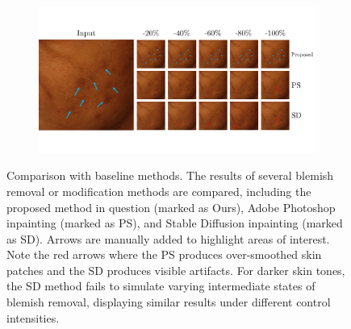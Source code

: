 \begin{spacing}{1.5}
\begin{figure}[t!]
\begin{subfigure}{\textwidth}
    \end{subfigure}
    \hfill
    \begin{subfigure}{\textwidth}
        \centering
        \includegraphics[width=\linewidth]{Chapter5/baseline/baseline44.pdf}
    \end{subfigure}
    \caption{Comparison with baseline methods. The results of several blemish removal or modification methods are compared, including the proposed method in question (marked as Ours), Adobe Photoshop\cite{adobephotoshop} inpainting (marked as PS), and Stable Diffusion\cite{rombach2021highresolution} inpainting (marked as SD). Arrows are manually added to highlight areas of interest. Note the red arrows where the PS produces over-smoothed skin patches and the SD produces visible artifacts. For darker skin tones, the SD method fails to simulate varying intermediate states of blemish removal, displaying similar results under different control intensities.}
    \label{fig:baseline}
\end{figure}


\end{spacing}
